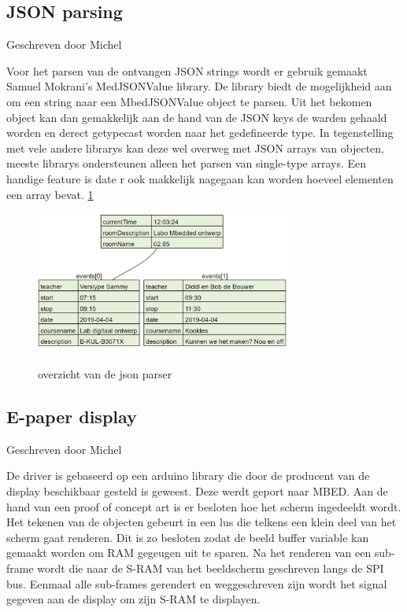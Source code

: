 \documentclass[a4paper,kul]{kulakarticle} %
\begin{document}
\subsection{JSON parsing}
{\scriptsize Geschreven door Michel}
\newline

Voor het parsen van de ontvangen JSON strings wordt er gebruik gemaakt Samuel Mokrani’s MedJSONValue library. De library biedt de mogelijkheid aan om een string naar een MbedJSONValue object te parsen. Uit het bekomen object kan dan gemakkelijk aan de hand van de JSON keys de warden gehaald worden en derect getypecast worden naar het gedefineerde type. In tegenstelling met vele andere librarys kan deze wel overweg met JSON arrays van objecten, meeste librarys ondersteunen alleen het parsen van single-type arrays. Een handige feature is date r ook makkelijk nagegaan kan worden hoeveel elementen een array bevat. \ref{fig:json}

\begin{figure}[h]
	\centering
	\includegraphics[width=0.75\textwidth]{json}
	\label{fig:json}
	\caption{overzicht van de json parser}
\end{figure}

\subsection{E-paper display}
{\scriptsize Geschreven door Michel}
\newline

De driver is gebaseerd op een arduino library die door de producent van de display beschikbaar gesteld is geweest. Deze werdt geport naar MBED. Aan de hand van een proof of concept art is er besloten hoe het scherm ingedeeldt wordt. Het tekenen van de objecten gebeurt in een lus die telkens een klein deel van het scherm gaat renderen. Dit is zo besloten zodat de beeld buffer variable kan gemaakt worden om RAM gegeugen uit te sparen. Na het renderen van een sub-frame wordt die naar de S-RAM van het beeldscherm geschreven langs de SPI bus. Eenmaal alle sub-frames gerendert en weggeschreven zijn wordt het signal gegeven aan de display om zijn S-RAM te displayen.
\end{document}
